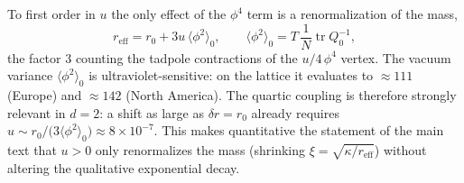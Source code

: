 \noindent To first order in $u$ the only effect of the $\phi^4$ term is a renormalization of the mass,
\begin{equation}
r_{\mathrm{eff}}=r_0+3u\,\langle\phi^2\rangle_0,\qquad
\langle\phi^2\rangle_0=T\,\frac{1}{N}\operatorname{tr}Q_0^{-1},
\end{equation}
the factor $3$ counting the tadpole contractions of the $u/4\,\phi^4$ vertex. The vacuum variance
$\langle\phi^2\rangle_0$ is ultraviolet-sensitive: on the lattice it evaluates to $\approx111$ (Europe) and
$\approx142$ (North America). The quartic coupling is therefore
strongly relevant in $d=2$: a shift as large as $\delta r=r_0$ already requires
$u\sim r_0/\bigl(3\langle\phi^2\rangle_0\bigr)\approx8\times10^{-7}$. This makes quantitative the statement of
the main text that $u>0$ only renormalizes the mass (shrinking $\xi=\sqrt{\kappa/r_{\mathrm{eff}}}$) without
altering the qualitative exponential decay.

\newpage
